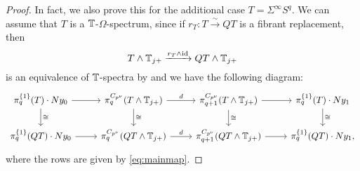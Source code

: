 \begin{proof}
In fact, we also prove this for the additional case $T = \Sigma^\infty S^q$. We can assume that $T$ is
a $\mathbb{T}$-$\Omega$-spectrum, since if $r_T:T\xrightarrow{\sim} QT$ is a fibrant replacement,
then 
\[
T\wedge \mathbb{T}_{j+}\xrightarrow{r_T\wedge \mathrm{id}} QT\wedge\mathbb{T}_{j+}
\]
is an equivalence of $\mathbb{T}$-spectra by \cite[Theorem 3.11, \pno~47]{mandellmay}
and we have the following diagram:
\[
\begin{tikzcd}
\pi^{\{1\}}_q(T)\cdot Ny_0
\arrow{r}\arrow{d}{\cong}
&\pi^{C_{p^\nu}}_q(T\wedge\TT_{j+})
\arrow{r}{d}\arrow{d}{\cong}
&\pi^{C_{p^\nu}}_{q+1}(T\wedge\TT_{j+})
\arrow{r}\arrow{d}{\cong}
&\pi_q^{\{1\}}(T)\cdot Ny_1
\arrow{d}{\cong}\\
\pi^{\{1\}}_q(QT)\cdot Ny_0
\arrow{r}
&\pi^{C_{p^\nu}}_q(QT\wedge\TT_{j+})
\arrow{r}{d}
&\pi^{C_{p^\nu}}_{q+1}(QT\wedge\TT_{j+})
\arrow{r}
&\pi_q^{\{1\}}(QT)\cdot Ny_1,
\end{tikzcd}
\]
where the rows are given by \eqref{eq:mainmap}.


\end{proof}
